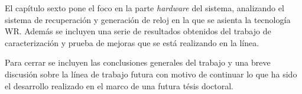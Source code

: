 El capítulo sexto pone el foco en la parte \textit{hardware} del sistema, 
analizando el sistema de recuperación y generación de reloj en la que se 
asienta la tecnología WR. Además se incluyen una serie de resultados obtenidos 
del trabajo de caracterización y prueba de mejoras que se está realizando en la 
línea.

Para cerrar se incluyen las conclusiones generales del trabajo y una breve 
discusión sobre la línea de trabajo futura con motivo de continuar lo que ha 
sido el desarrollo realizado en el marco de una futura tésis doctoral.